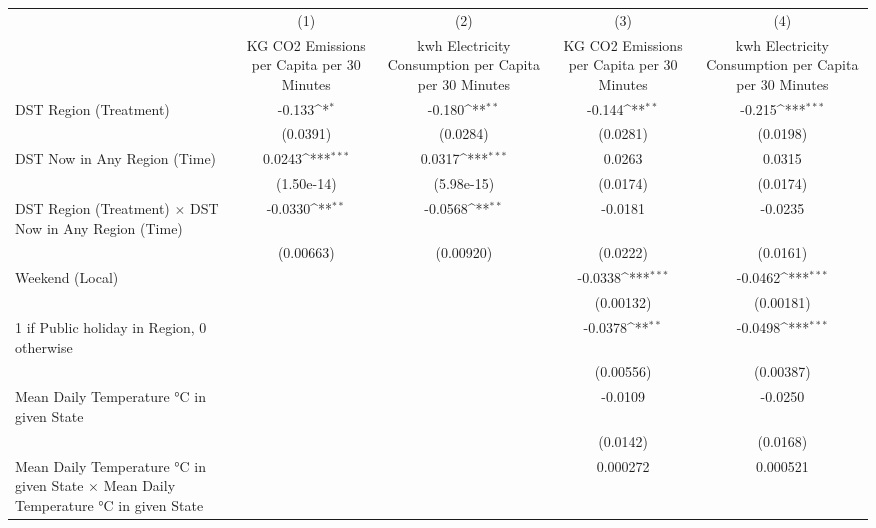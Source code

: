 {
\def\sym#1{\ifmmode^{#1}\else\(^{#1}\)\fi}
\begin{tabular}{l*{4}{c}}
\hline\hline
                    &\multicolumn{1}{c}{(1)}&\multicolumn{1}{c}{(2)}&\multicolumn{1}{c}{(3)}&\multicolumn{1}{c}{(4)}\\
                    &\multicolumn{1}{c}{KG CO2 Emissions per Capita per 30 Minutes}&\multicolumn{1}{c}{kwh Electricity Consumption per Capita per 30 Minutes}&\multicolumn{1}{c}{KG CO2 Emissions per Capita per 30 Minutes}&\multicolumn{1}{c}{kwh Electricity Consumption per Capita per 30 Minutes}\\
\hline
DST Region (Treatment)&      -0.133\sym{*}  &      -0.180\sym{**} &      -0.144\sym{**} &      -0.215\sym{***}\\
                    &    (0.0391)         &    (0.0284)         &    (0.0281)         &    (0.0198)         \\
[1em]
DST Now in Any Region (Time)&      0.0243\sym{***}&      0.0317\sym{***}&      0.0263         &      0.0315         \\
                    &  (1.50e-14)         &  (5.98e-15)         &    (0.0174)         &    (0.0174)         \\
[1em]
DST Region (Treatment) $\times$ DST Now in Any Region (Time)&     -0.0330\sym{**} &     -0.0568\sym{**} &     -0.0181         &     -0.0235         \\
                    &   (0.00663)         &   (0.00920)         &    (0.0222)         &    (0.0161)         \\
[1em]
Weekend (Local)     &                     &                     &     -0.0338\sym{***}&     -0.0462\sym{***}\\
                    &                     &                     &   (0.00132)         &   (0.00181)         \\
[1em]
1 if Public holiday in Region, 0 otherwise&                     &                     &     -0.0378\sym{**} &     -0.0498\sym{***}\\
                    &                     &                     &   (0.00556)         &   (0.00387)         \\
[1em]
Mean Daily Temperature °C in given State&                     &                     &     -0.0109         &     -0.0250         \\
                    &                     &                     &    (0.0142)         &    (0.0168)         \\
[1em]
Mean Daily Temperature °C in given State $\times$ Mean Daily Temperature °C in given State&                     &                     &    0.000272         &    0.000521         \\

\end{tabular}}
